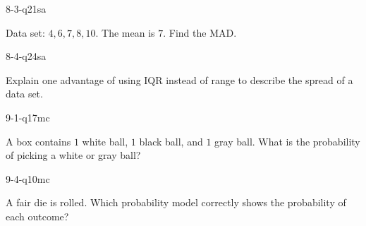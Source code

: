 \begin{practiceQuestion}{8-3-q21}{sa}
\begin{questionText}
Data set: $4, 6, 7, 8, 10$. The mean is $7$. Find the MAD.
\end{questionText}
\end{practiceQuestion}

\begin{practiceQuestion}{8-4-q24}{sa}
\begin{questionText}
Explain one advantage of using IQR instead of range to describe the spread of a data set.
\end{questionText}
\end{practiceQuestion}

\begin{practiceQuestion}{9-1-q17}{mc}
\begin{questionText}
A box contains $1$ white ball, $1$ black ball, and $1$ gray ball. What is the probability of picking a white or gray ball?
\end{questionText}
\end{practiceQuestion}

\begin{practiceQuestion}{9-4-q10}{mc}
\begin{questionText}
A fair die is rolled. Which probability model correctly shows the probability of each outcome?
\end{questionText}
\end{practiceQuestion}

